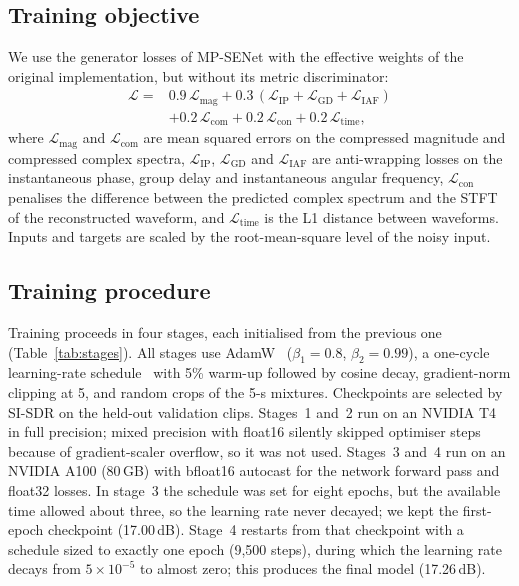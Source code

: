 \documentclass[conference]{IEEEtran}
\begin{document}
\subsection{Training objective}
We use the generator losses of MP-SENet with the effective weights of the original implementation, but without its metric discriminator:
\begin{equation}
\begin{split}
\mathcal{L}={}&0.9\,\mathcal{L}_\text{mag}+0.3\,(\mathcal{L}_\text{IP}+\mathcal{L}_\text{GD}+\mathcal{L}_\text{IAF})\\
&+0.2\,\mathcal{L}_\text{com}+0.2\,\mathcal{L}_\text{con}+0.2\,\mathcal{L}_\text{time},
\end{split}
\end{equation}
where $\mathcal{L}_\text{mag}$ and $\mathcal{L}_\text{com}$ are mean squared errors on the compressed magnitude and compressed complex spectra, $\mathcal{L}_\text{IP}$, $\mathcal{L}_\text{GD}$ and $\mathcal{L}_\text{IAF}$ are anti-wrapping losses on the instantaneous phase, group delay and instantaneous angular frequency, $\mathcal{L}_\text{con}$ penalises the difference between the predicted complex spectrum and the STFT of the reconstructed waveform, and $\mathcal{L}_\text{time}$ is the L1 distance between waveforms. Inputs and targets are scaled by the root-mean-square level of the noisy input.

\subsection{Training procedure}\label{sec:training}
Training proceeds in four stages, each initialised from the previous one (Table~\ref{tab:stages}). All stages use AdamW~\cite{loshchilov2017decoupled} ($\beta_1{=}0.8$, $\beta_2{=}0.99$), a one-cycle learning-rate schedule~\cite{smith2019super} with 5\% warm-up followed by cosine decay, gradient-norm clipping at 5, and random crops of the 5-s mixtures. Checkpoints are selected by SI-SDR on the held-out validation clips. Stages~1 and~2 run on an NVIDIA T4 in full precision; mixed precision with float16 silently skipped optimiser steps because of gradient-scaler overflow, so it was not used. Stages~3 and~4 run on an NVIDIA A100 (80\,GB) with bfloat16 autocast for the network forward pass and float32 losses. In stage~3 the schedule was set for eight epochs, but the available time allowed about three, so the learning rate never decayed; we kept the first-epoch checkpoint (17.00\,dB). Stage~4 restarts from that checkpoint with a schedule sized to exactly one epoch (9{,}500 steps), during which the learning rate decays from $5{\times}10^{-5}$ to almost zero; this produces the final model (17.26\,dB).
\end{document}
